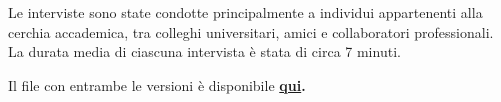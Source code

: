 \documentclass{article}
\begin{document}
        Le interviste sono state condotte principalmente a individui appartenenti alla cerchia accademica, tra colleghi universitari, amici e collaboratori professionali. La durata media di ciascuna intervista è stata di circa 7 minuti.\par
        \par Il file con entrambe le versioni è disponibile \textbf{\href{https://wind-blob-6b0.notion.site/Interviste-de02a85b8b634f7687534d2064010b4a}{qui}.}\par
    \vspace{1cm}\par
    \vspace{0.5cm}
    \begin{enumerate}
    

\end{enumerate}
\end{document}
